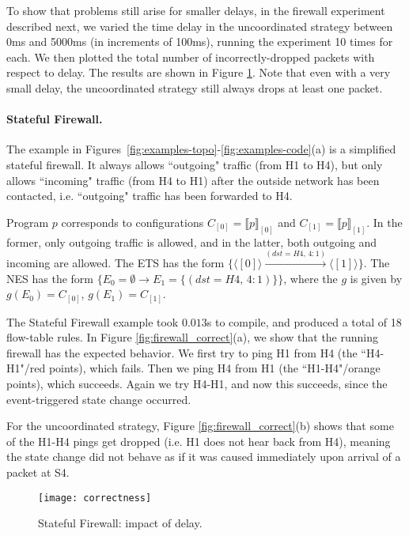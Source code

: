 \documentclass[pldi-cameraready]{sigplanconf}
\begin{document}
To show that problems still arise for smaller delays,
in the firewall experiment described next, we varied the
time delay in the uncoordinated strategy between 0ms and 5000ms (in increments of 100ms),
running the experiment 10 times for each. We then plotted the total number of incorrectly-dropped
packets with respect to delay. The results are shown in Figure \ref{fig:firewall_correct_corr}.
Note that even with a very small delay, the uncoordinated strategy
still always drops at least one packet.





\paragraph{Stateful Firewall.} 
The example in Figures~\ref{fig:examples-topo}-\ref{fig:examples-code}(a)
is a simplified stateful firewall. It always allows ``outgoing"
traffic (from H1 to H4), but only allows ``incoming" traffic (from H4
to H1) after the outside network has been contacted, i.e. ``outgoing"
traffic has been forwarded to H4.



Program $p$ corresponds to configurations
$C_{[0]} = \llbracket{p}\rrbracket_{[0]}$
and
$C_{[1]} = \llbracket{p}\rrbracket_{[1]}$.
In the former, only outgoing traffic is allowed, and in the
latter, both outgoing and incoming are allowed.
The ETS has the form $\{\langle [0] \rangle \xrightarrow{(dst{=}H4,\,{4{:}1})} \langle [1] \rangle\}$.
The NES has the form $\{E_0{=}\emptyset \rightarrow E_1{=}\{(dst{=}H4,\,{4{:}1})\}\}$,
where the $g$ is given by $g(E_0)=C_{[0]}$, $g(E_1)=C_{[1]}$.

The Stateful Firewall example took $0.013$s to compile, and produced a total of 18 flow-table rules.
In Figure \ref{fig:firewall_correct}(a), we show that the running firewall has
the expected behavior. We first try to ping H1 from H4 (the ``H4-H1"/red points),
which fails.
Then we ping H4 from H1 (the ``H1-H4"/orange points), which succeeds.
Again we try H4-H1, and now this succeeds, since the event-triggered state change occurred.

For the uncoordinated strategy, Figure \ref{fig:firewall_correct}(b) shows that
some of the H1-H4 pings get dropped (i.e. H1 does not hear back from H4), meaning the
state change did not behave as if it was caused immediately upon arrival of a packet at S4.

\begin{figure}[b]
\centering
\texttt{[image: correctness]}
\caption{Stateful Firewall: impact of delay.}
\label{fig:firewall_correct_corr}
\end{figure}
\end{document}
